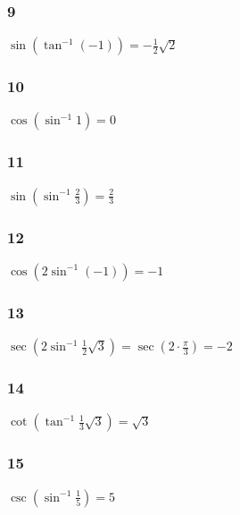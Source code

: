 \documentclass[]{report}
\begin{document}
\subsubsection{9}
$\sin(\tan^{-1}(-1)) = -\frac{1}{2}\sqrt{2}$
\subsubsection{10}
$\cos(\sin^{-1}1) = 0$
\subsubsection{11}
$\sin(\sin^{-1}\frac{2}{3}) = \frac{2}{3}$
\subsubsection{12}
$\cos(2\sin^{-1}(-1)) = -1$
\subsubsection{13}
$\sec(2\sin^{-1}\frac{1}{2}\sqrt{3}) = \sec (2 \cdot \frac{\pi}{3}) = -2$
\subsubsection{14}
$\cot(\tan^{-1}\frac{1}{3}\sqrt{3}) = \sqrt{3}$
\subsubsection{15}
$\csc(\sin^{-1}\frac{1}{5}) = 5$
\end{document}
